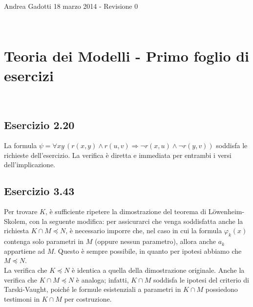\documentclass[10pt,a4paper]{article}
\begin{document}
\noindent Andrea Gadotti \hfill 18 marzo 2014 - Revisione 0 

\

\section*{Teoria dei Modelli - Primo foglio di esercizi}

\
\subsection*{Esercizio 2.20}
La formula $\psi= \forall x y \, (r(x,y) \wedge r(u,v) \Rightarrow \neg r(x,u) \wedge \neg r(y,v))$ soddisfa le richieste dell'esercizio. La verifica è diretta e immediata per entrambi i versi dell'implicazione.

\subsection*{Esercizio 3.43}
Per trovare $K$, è sufficiente ripetere la dimostrazione del teorema di Löwenheim-Skolem, con la seguente modifica: per assicurarci che venga soddisfatta anche la richiesta $K \cap M \preceq N$, è necessario imporre che, nel caso in cui la formula $\varphi_k(x)$ contenga solo parametri in $M$ (oppure nessun parametro), allora anche $a_k$ appartiene ad $M$. Questo è sempre possibile, in quanto per ipotesi abbiamo che $M \preceq N$.\\
La verifica che $K \preceq N$ è identica a quella della dimostrazione originale. Anche la verifica che $K \cap M \preceq N$ è analoga; infatti, $K \cap M$ soddisfa le ipotesi del criterio di Tarski-Vaught, poiché le formule esistenziali a parametri in $K \cap M$ possiedono testimoni in $K \cap M$ per costruzione.
\end{document}

